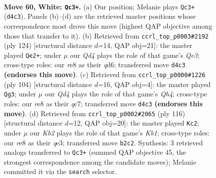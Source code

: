 \documentclass[11pt]{article}
\begin{document}
\clearpage

\begin{figure}[p]\centering
\begin{subfigure}{0.46\textwidth}\centering
\resizebox{\linewidth}{!}{%
\newchessgame
\chessboard[
  setfen={4r3/2k5/8/6P1/3QP2P/8/1K6/8 w - - 5 60},
  showmover=false,
  pgfstyle=straightmove, color=movearrow, markmove={d4-c3}
]}
\caption{}
\end{subfigure}\hfill
\begin{subfigure}{0.46\textwidth}\centering
\resizebox{\linewidth}{!}{%
\newchessgame
\chessboard[
  setfen={8/8/3q4/8/p7/4QP2/1k5P/4K3 w - - 0 63},
  showmover=false,
  pgfstyle=straightmove, color=movearrow, markmove={e3-e2}
]}
\caption{}
\end{subfigure}
\\[4pt]
\begin{subfigure}{0.46\textwidth}\centering
\resizebox{\linewidth}{!}{%
\newchessgame
\chessboard[
  setfen={6k1/2q5/6p1/8/6PQ/8/5P1K/8 w - - 1 53},
  showmover=false,
  pgfstyle=straightmove, color=movearrow, markmove={h4-g3}
]}
\caption{}
\end{subfigure}\hfill
\begin{subfigure}{0.46\textwidth}\centering
\resizebox{\linewidth}{!}{%
\newchessgame
\chessboard[
  setfen={8/1k6/3Q2P1/1p6/8/P3q3/8/1K6 w - - 9 59},
  showmover=false,
  pgfstyle=straightmove, color=movearrow, markmove={b1-c2}
]}
\caption{}
\end{subfigure}
\caption{\textbf{Move 60, White: \texttt{Qc3+}.} (a) Our position; Melanie plays \texttt{Qc3+} (\texttt{d4c3}). Panels (b)--(d) are the retrieved master positions whose correspondence most drove this move (highest QAP objective among those that transfer to it). (b) Retrieved from \texttt{ccrl\_top\_p0003\#2192} (ply 124) [structural distance $d$=14, QAP obj=21]: the master played \texttt{Qe2+}; under $\mu$ our \emph{Qd4} plays the role of that game's \emph{Qe3}; cross-type roles: our \emph{r}e8 as their \emph{q}d6; transferred move \texttt{d4c3} \textbf{(endorses this move)}. (c) Retrieved from \texttt{ccrl\_top\_p0000\#1226} (ply 104) [structural distance $d$=16, QAP obj=4]: the master played \texttt{Qg3}; under $\mu$ our \emph{Qd4} plays the role of that game's \emph{Qh4}; cross-type roles: our \emph{r}e8 as their \emph{q}c7; transferred move \texttt{d4c3} \textbf{(endorses this move)}. (d) Retrieved from \texttt{ccrl\_top\_p0002\#2065} (ply 116) [structural distance $d$=12, QAP obj=20]: the master played \texttt{Kc2}; under $\mu$ our \emph{Kb2} plays the role of that game's \emph{Kb1}; cross-type roles: our \emph{r}e8 as their \emph{q}e3; transferred move \texttt{b2c2}. Synthesis: 3 retrieved analogs transferred to \texttt{Qc3+} (summed QAP objective 45, the strongest correspondence among the candidate moves); Melanie committed it via the \texttt{search} selector.}
\label{fig:thought-m118}
\end{figure}
\end{document}
